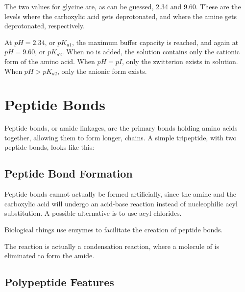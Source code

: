 		The two \pKa{} values for glycine are, as can be guessed, \num{2.34} and \num{9.60}. These are the \pH{} levels where the carboxylic
		acid gets deprotonated, and where the amine gets deprotonated, respectively.

		At $pH = 2.34$, or $pK_{a1}$, the maximum buffer capacity is reached, and again at $pH = 9.60$, or $pK_{a2}$. When no  is
		added, the solution contains only the cationic form of the amino acid. When $pH = pI$, only the zwitterion exists in solution. When
		$pH > pK_{a2}$, only the anionic form exists.


	\pagebreak
	\section{Peptide Bonds}

		Peptide bonds, or amide linkages, are the primary bonds holding amino acids together, allowing them to form longer, 
		chains. A simple tripeptide, with two peptide bonds, looks like this:



		\subsection{Peptide Bond Formation}

			Peptide bonds cannot actually be formed artificially, since the amine and the carboxylic acid will undergo an acid-base reaction
			instead of nucleophilic acyl substitution. A possible alternative is to use acyl chlorides.

			Biological things use enzymes to facilitate the creation of peptide bonds.

			The reaction is actually a condensation reaction, where a molecule of  is eliminated to form the amide.



		\subsection{Polypeptide Features}

